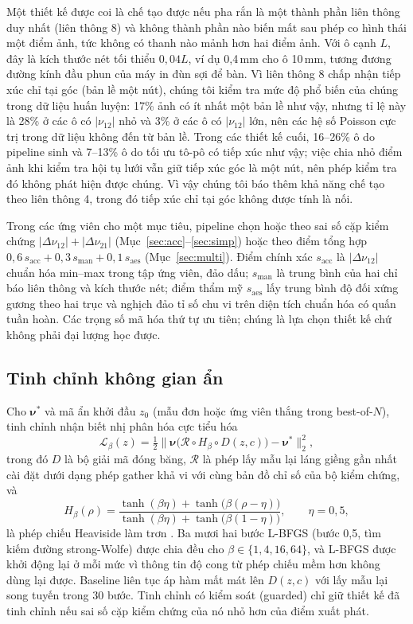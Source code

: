 \documentclass[a4paper,11pt]{article}
\newcommand{\nuot}{\nu_{12}}
\newcommand{\nuto}{\nu_{21}}
\begin{document}
Một thiết kế được coi là chế tạo được nếu pha rắn là một thành phần liên
thông duy nhất (liên thông 8) và không thành phần nào biến mất sau phép co
hình thái một điểm ảnh, tức không có thanh nào mảnh hơn hai điểm ảnh. Với ô
cạnh $L$, đây là kích thước nét tối thiểu $0,04L$, ví dụ 0,4\,mm cho ô
10\,mm, tương đương đường kính đầu phun của máy in đùn sợi để bàn. Vì liên
thông 8 chấp nhận tiếp xúc chỉ tại góc (bản lề một nút), chúng tôi kiểm tra
mức độ phổ biến của chúng trong dữ liệu huấn luyện: 17\% ảnh có ít nhất một
bản lề như vậy, nhưng tỉ lệ này là 28\% ở các ô có $|\nuot|$ nhỏ và 3\% ở các
ô có $|\nuot|$ lớn, nên các hệ số Poisson cực trị trong dữ liệu không đến từ
bản lề. Trong các thiết kế cuối, 16--26\% ô do pipeline sinh và 7--13\% ô do
tối ưu tô-pô có tiếp xúc như vậy; việc chia nhỏ điểm ảnh khi kiểm tra hội tụ
lưới vẫn giữ tiếp xúc góc là một nút, nên phép kiểm tra đó không phát hiện
được chúng. Vì vậy chúng tôi báo thêm khả năng chế tạo theo liên thông 4,
trong đó tiếp xúc chỉ tại góc không được tính là nối.

Trong các ứng viên cho một mục tiêu, pipeline chọn hoặc theo sai số cặp kiểm
chứng $|\Delta\nuot|+|\Delta\nuto|$ (Mục~\ref{sec:acc}--\ref{sec:simp}) hoặc
theo điểm tổng hợp
$0,6\,s_{\mathrm{acc}}+0,3\,s_{\mathrm{man}}+0,1\,s_{\mathrm{aes}}$
(Mục~\ref{sec:multi}). Điểm chính xác $s_{\mathrm{acc}}$ là $|\Delta\nuot|$
chuẩn hóa min--max trong tập ứng viên, đảo dấu; $s_{\mathrm{man}}$ là trung
bình của hai chỉ báo liên thông và kích thước nét; điểm thẩm mỹ
$s_{\mathrm{aes}}$ lấy trung bình độ đối xứng gương theo hai trục và nghịch
đảo tỉ số chu vi trên diện tích chuẩn hóa có quấn tuần hoàn. Các trọng số
mã hóa thứ tự ưu tiên; chúng là lựa chọn thiết kế chứ không phải đại lượng
học được.

\subsection{Tinh chỉnh không gian ẩn}
Cho $\boldsymbol\nu^{*}$ và mã ẩn khởi đầu $z_0$ (mẫu đơn hoặc ứng viên thắng
trong best-of-$N$), tinh chỉnh nhận biết nhị phân hóa cực tiểu hóa
\begin{equation}
\mathcal L_\beta(z)=\tfrac12\bigl\lVert
\boldsymbol\nu\bigl(\mathcal R\circ H_\beta\circ D(z,c)\bigr)
-\boldsymbol\nu^{*}\bigr\rVert_2^2 ,
\end{equation}
trong đó $D$ là bộ giải mã đóng băng, $\mathcal R$ là phép lấy mẫu lại láng
giềng gần nhất cài đặt dưới dạng phép gather khả vi với cùng bản đồ chỉ số
của bộ kiểm chứng, và
\begin{equation}
H_\beta(\rho)=\frac{\tanh(\beta\eta)+\tanh\bigl(\beta(\rho-\eta)\bigr)}
{\tanh(\beta\eta)+\tanh\bigl(\beta(1-\eta)\bigr)},\qquad \eta=0,5,
\end{equation}
là phép chiếu Heaviside làm trơn \citep{wang2011projection}. Ba mươi hai bước
L-BFGS \citep{liu1989lbfgs} (bước 0,5, tìm kiếm đường strong-Wolfe) được chia
đều cho $\beta\in\{1,4,16,64\}$, và L-BFGS được khởi động lại ở mỗi mức vì
thông tin độ cong từ phép chiếu mềm hơn không dùng lại được. Baseline liên
tục áp hàm mất mát lên $D(z,c)$ với lấy mẫu lại song tuyến trong 30 bước.
Tinh chỉnh có kiểm soát (guarded) chỉ giữ thiết kế đã tinh chỉnh nếu sai số
cặp kiểm chứng của nó nhỏ hơn của điểm xuất phát.
\end{document}
